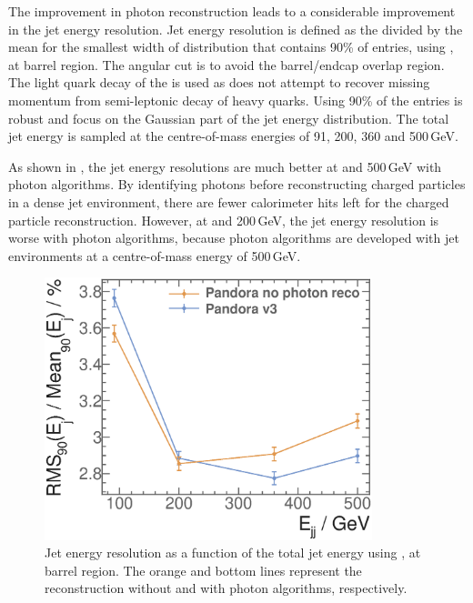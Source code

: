 The improvement in photon reconstruction leads to a considerable improvement in the jet energy resolution. Jet energy resolution is defined as the \rms divided by the mean for the smallest width of distribution that contains 90\% of entries, using \eeZuds, at barrel region. The angular cut is to avoid the barrel/endcap overlap region. The light quark decay of the \Zprime is used as \pandora does not attempt to recover missing momentum from semi-leptonic decay of heavy quarks. Using 90\% of the entries is robust and focus on the Gaussian part of the jet energy distribution. The total jet energy is sampled at the centre-of-mass energies of 91, 200, 360 and 500\,GeV. 

As shown in , the jet energy resolutions are much better at  and 500\,GeV with photon algorithms. By identifying photons before reconstructing charged particles in a dense jet environment, there are fewer calorimeter hits left for the charged particle reconstruction. However, at  and 200\,GeV, the jet energy resolution is worse with photon algorithms, because photon algorithms are developed with  jet environments at a centre-of-mass energy of 500\,GeV.

\begin{figure}[tbph]
\centering
\includegraphics[width=0.85\textwidth]{photon/JERmuon.eps}
\caption[Jet energy resolution as a function of the total jet energy without and with photon related algorithms]
{Jet energy resolution as a function of the  total jet energy using \eeZuds,  at barrel region. The orange and bottom lines represent the reconstruction without and with photon algorithms, respectively.}
\label{fig:photonJERmuon}
\end{figure}


